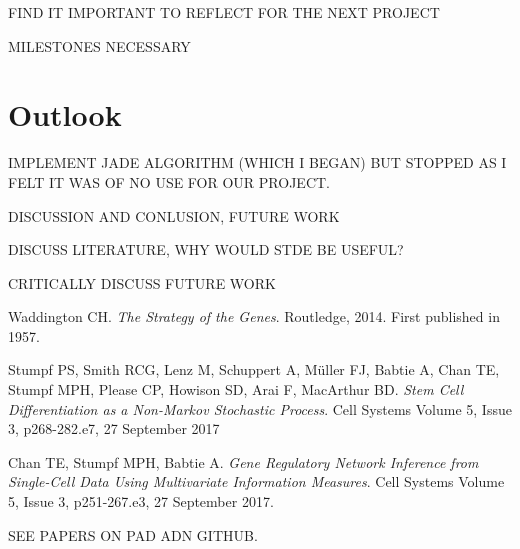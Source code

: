 \documentclass[journal, a4paper]{IEEEtran}
\begin{document}
FIND IT IMPORTANT TO REFLECT FOR THE NEXT PROJECT

MILESTONES NECESSARY


\section{Outlook}

IMPLEMENT JADE ALGORITHM (WHICH I BEGAN) BUT STOPPED AS I FELT IT WAS OF NO USE FOR OUR PROJECT. 

DISCUSSION AND CONLUSION, FUTURE WORK

DISCUSS LITERATURE, WHY WOULD STDE BE USEFUL?

CRITICALLY DISCUSS FUTURE WORK

\begin{thebibliography}{99}
	
	Waddington CH. \textit{The Strategy of the Genes}. Routledge, 2014. First published in 1957. 
	
	Stumpf PS, Smith RCG, Lenz M, Schuppert A, M{\"u}ller FJ, Babtie A,
	Chan TE, Stumpf MPH, Please CP, Howison SD, Arai F, MacArthur BD. \textit{Stem Cell Differentiation as a Non-Markov Stochastic Process}. Cell Systems Volume 5, Issue 3, p268-282.e7, 27 September 2017 
	
	Chan TE, Stumpf MPH, Babtie A. \textit{Gene Regulatory Network Inference from Single-Cell Data Using Multivariate Information Measures}. Cell Systems Volume 5, Issue 3, p251-267.e3, 27 September 2017.
	
	
	SEE PAPERS ON PAD ADN GITHUB.
	
	
\end{thebibliography}

\end{document}

